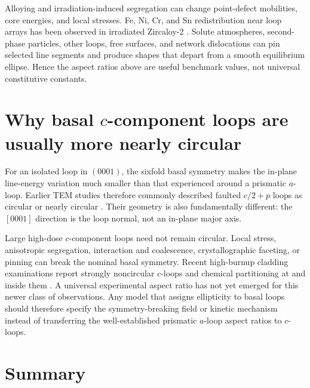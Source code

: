 \documentclass[11pt]{article}
\begin{document}
Alloying and irradiation-induced segregation can change point-defect mobilities, core energies, and local stresses. Fe, Ni, Cr, and Sn redistribution near loop arrays has been observed in irradiated Zircaloy-2 \citep{Harte2017Matrix}. Solute atmospheres, second-phase particles, other loops, free surfaces, and network dislocations can pin selected line segments and produce shapes that depart from a smooth equilibrium ellipse. Hence the aspect ratios above are useful benchmark values, not universal constitutive constants.

\section{Why basal $c$-component loops are usually more nearly circular}

For an isolated loop in $(0001)$, the sixfold basal symmetry makes the in-plane line-energy variation much smaller than that experienced around a prismatic $a$-loop. Earlier TEM studies therefore commonly described faulted $c/2+p$ loops as circular or nearly circular \citep{Harte2017Matrix,Hulse2021Atomistic}. Their geometry is also fundamentally different: the $[0001]$ direction is the loop normal, not an in-plane major axis.

Large high-dose $c$-component loops need not remain circular. Local stress, anisotropic segregation, interaction and coalescence, crystallographic faceting, or pinning can break the nominal basal symmetry. Recent high-burnup cladding examinations report strongly noncircular $c$-loops and chemical partitioning at and inside them \citep{Mayweg2024Islands}. A universal experimental aspect ratio has not yet emerged for this newer class of observations. Any model that assigns ellipticity to basal loops should therefore specify the symmetry-breaking field or kinetic mechanism instead of transferring the well-established prismatic $a$-loop aspect ratios to $c$-loops.

\section{Summary}
\end{document}
